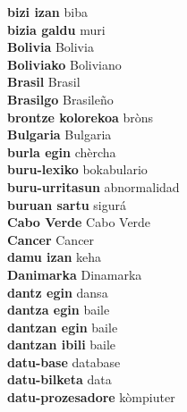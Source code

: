 \textbf{ bizi izan  } biba \\
\textbf{ bizia galdu  } muri \\
\textbf{ Bolivia  } Bolivia \\
\textbf{ Boliviako  } Boliviano \\
\textbf{ Brasil  } Brasil \\
\textbf{ Brasilgo  } Brasileño \\
\textbf{ brontze kolorekoa  } bròns \\
\textbf{ Bulgaria  } Bulgaria \\
\textbf{ burla egin  } chèrcha \\
\textbf{ buru-lexiko  } bokabulario \\
\textbf{ buru-urritasun  } abnormalidad \\
\textbf{ buruan sartu  } sigurá \\
\textbf{ Cabo Verde  } Cabo Verde \\
\textbf{ Cancer  } Cancer \\
\textbf{ damu izan  } keha \\
\textbf{ Danimarka  } Dinamarka \\
\textbf{ dantz egin  } dansa \\
\textbf{ dantza egin  } baile \\
\textbf{ dantzan egin  } baile \\
\textbf{ dantzan ibili  } baile \\
\textbf{ datu-base  } database \\
\textbf{ datu-bilketa  } data \\
\textbf{ datu-prozesadore  } kòmpiuter \\
